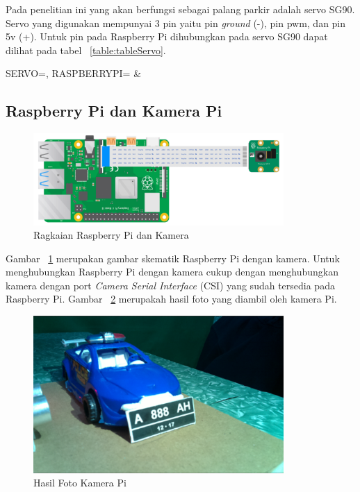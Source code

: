 Pada penelitian ini yang akan berfungsi sebagai palang parkir adalah servo SG90. Servo yang digunakan mempunyai 3 pin yaitu pin \textit{ground} (-), pin pwm, dan pin 5v (+). Untuk pin pada Raspberry Pi dihubungkan pada servo SG90 dapat dilihat pada tabel ~\ref{table:tableServo}.

\begin{atable}
    \caption{Rangkaian pin Servo ke Raspberry Pi}
    \label{table:tableServo}
        {
            SERVO=\SERVO, 
            RASPBERRYPI=\RASPBERRYPI}
        {
            \SERVO & 
            \RASPBERRYPI}
\end{atable}

\subsection{Raspberry Pi dan Kamera Pi}
\begin{figure} [H]
    \includegraphics[width=0.85\textwidth, center]{images/skematik-kamera.png}
    \caption{Ragkaian Raspberry Pi dan Kamera}
    \label{fig:skematikKamera}
\end{figure}

Gambar ~\ref{fig:skematikKamera} merupakan gambar skematik Raspberry Pi dengan kamera. Untuk menghubungkan Raspberry Pi dengan kamera cukup dengan menghubungkan kamera dengan port \textit{Camera Serial Interface} (CSI) yang sudah tersedia pada Raspberry Pi. Gambar ~\ref{fig:GambarKameraPi} merupakah hasil foto yang diambil oleh kamera Pi.

\begin{figure} [H]
    \includegraphics[width=0.85\textwidth, center]{images/Hasil Gambar Kamera Pi.png}
    \caption{Hasil Foto Kamera Pi}
    \label{fig:GambarKameraPi}
\end{figure}


